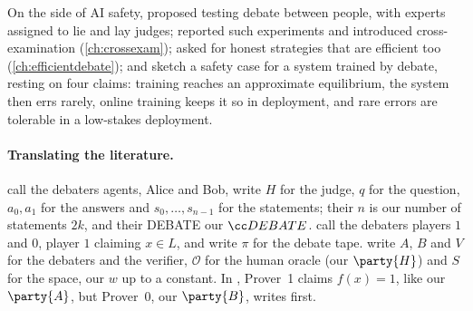 \begin{refsection}
On the side of AI safety, \textcite{IrvingAskell2019} proposed testing debate between people, with experts assigned to lie and lay judges; \textcite{BarnesChristiano2020} reported such experiments and introduced cross-examination (\cref{ch:crossexam}); \textcite{BrownCohenEtAl2024} asked for honest strategies that are efficient too (\cref{ch:efficientdebate}); and \textcite{BuhlEtAl2025} sketch a safety case for a system trained by debate, resting on four claims: training reaches an approximate equilibrium, the system then errs rarely, online training keeps it so in deployment, and rare errors are tolerable in a low-stakes deployment.

\paragraph{Translating the literature.} \Textcite{IrvingEtAl2018} call the debaters agents, Alice and Bob, write $H$ for the judge, $q$ for the question, $a_0,a_1$ for the answers and $s_0,\dots,s_{n-1}$ for the statements; their $n$ is our number of statements $2k$, and their DEBATE our $\debateclass$. \Textcite{CondonEtAl1995} call the debaters players $1$ and $0$, player $1$ claiming $x\in L$, and write $\pi$ for the debate tape. \Textcite{BrownCohenEtAl2024} write $A$, $B$ and $V$ for the debaters and the verifier, $\mathcal O$ for the human oracle (our $\party{H}$) and $S$ for the space, our $w$ up to a constant. In \textcite{BrownCohenEtAl2026Query}, Prover~1 claims $f(x)=1$, like our $\party{A}$, but Prover~0, our $\party{B}$, writes first.

\printchapterbib
\end{refsection}
